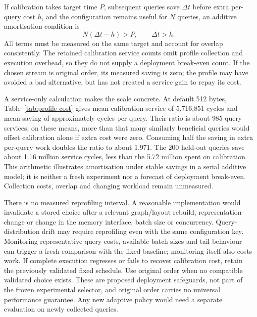 If calibration takes target time $P$, subsequent queries save $\Delta t$ before extra per-query cost $h$, and the configuration remains useful for $N$ queries, an additive amortisation condition is
\begin{equation}
 N(\Delta t-h)>P,\qquad \Delta t>h.
\end{equation}
All terms must be measured on the same target and account for overlap consistently. The retained calibration service counts omit profile collection and execution overhead, so they do not supply a deployment break-even count. If the chosen stream is original order, its measured saving is zero; the profile may have avoided a bad alternative, but has not created a service gain to repay its cost.

A service-only calculation makes the scale concrete. At default 512 bytes, Table~\ref{tab:profile-cost} gives mean calibration service of 5,716,851 cycles and mean saving of approximately \RoundRobinBFSSavedFloat{} cycles per query. Their ratio is about 985 query services; on these means, more than that many similarly beneficial queries would offset calibration alone if extra cost were zero. Consuming half the saving in extra per-query work doubles the ratio to about 1,971. The 200 held-out queries save about 1.16 million service cycles, less than the 5.72 million spent on calibration. This arithmetic illustrates amortisation under stable savings in a serial additive model; it is neither a fresh experiment nor a forecast of deployment break-even. Collection costs, overlap and changing workload remain unmeasured.

There is no measured reprofiling interval. A reasonable implementation would invalidate a stored choice after a relevant graph/layout rebuild, representation change or change in the memory interface, batch size or concurrency. Query-distribution drift may require reprofiling even with the same configuration key. Monitoring representative query costs, available batch sizes and tail behaviour can trigger a fresh comparison with the fixed baseline; monitoring itself also costs work. If complete execution regresses or fails to recover calibration cost, retain the previously validated fixed schedule. Use original order when no compatible validated choice exists. These are proposed deployment safeguards, not part of the frozen experimental selector, and original order carries no universal performance guarantee. Any new adaptive policy would need a separate evaluation on newly collected queries.
